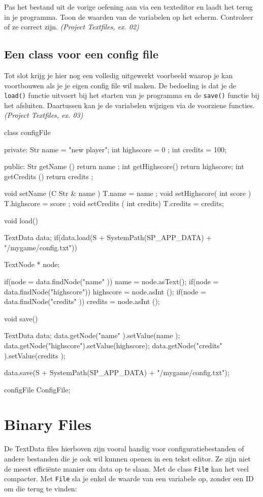 \begin{exercise}
Pas het bestand uit de vorige oefening aan via een texteditor en laadt het terug in je programma. Toon de waarden van de variabelen op het scherm. Controleer of ze correct zijn.  \textsl{(Project Textfiles, ex. 02)}
\end{exercise}

\subsection{Een class voor een config file}
Tot slot krijg je hier nog een volledig uitgewerkt voorbeeld waarop je kan voortbouwen als je je eigen config file wil maken. De bedoeling is dat je de \verb|load()| functie uitvoert bij het starten van je programma en de \verb|save()| functie bij het afsluiten. Daartussen kan je de variabelen wijzigen via de voorziene functies. \textsl{(Project Textfiles, ex. 03)}

\begin{code}
class configFile {
private:
  Str name      = "new player";
	int highscore = 0  ;
	int credits   = 100;
	
public:
  Str getName     () { return name     ; }
	int getHighscore() { return highscore; }
	int getCredits  () { return credits  ; }
	
	void setName     (C Str & name   ) { T.name      = name   ; }
	void setHighscore(  int   score  ) { T.highscore = score  ; }
	void setCredits  (  int   credits) { T.credits   = credits; }
	
	void load() {
	  TextData data;
		if(data.load(S + SystemPath(SP_APP_DATA) + "/mygame/config.txt")) {
		  TextNode * node;
			
			if(node = data.findNode("name"     )) name      = node.asText();
			if(node = data.findNode("highscore")) highscore = node.asInt ();
			if(node = data.findNode("credits"  )) credits   = node.asInt ();
	  }
  }
	
	void save() {
	  TextData data;
		data.getNode("name"     ).setValue(name     );
		data.getNode("highscore").setValue(highscore);
		data.getNode("credits"  ).setValue(credits  );
		
		data.save(S + SystemPath(SP_APP_DATA) + "/mygame/config.txt");
  }
}
configFile ConfigFile;
\end{code}	

\section{Binary Files}
De TextData files hierboven zijn vooral handig voor configuratiebestanden of andere bestanden die je ook wil kunnen openen in een tekst editor. Ze zijn niet de meest effici\"ente manier om data op te slaan. Met de class \verb|File| kan het veel compacter. Met \verb|File| sla je enkel de waarde van een variabele op, zonder een ID om die terug te vinden:

